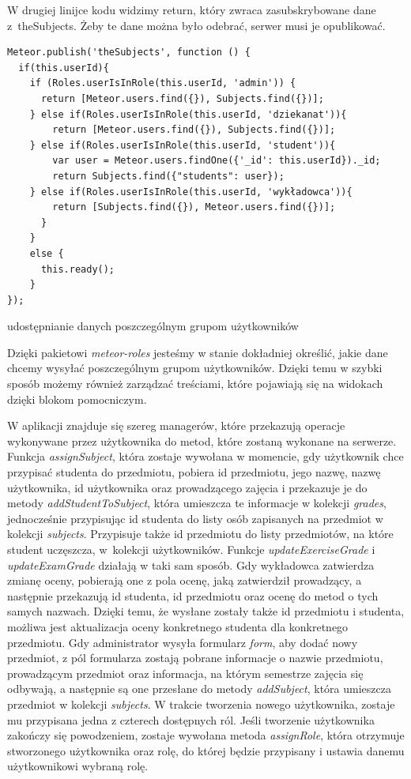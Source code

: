 \documentclass{xmgr}
\begin{document}
W drugiej linijce kodu widzimy return, który zwraca zasubskrybowane dane z~theSubjects. Żeby te dane można było odebrać, serwer musi je opublikować.

\begin{listing}[H]
\begin{verbatim}
Meteor.publish('theSubjects', function () {
  if(this.userId){
    if (Roles.userIsInRole(this.userId, 'admin')) {
      return [Meteor.users.find({}), Subjects.find({})];
    } else if(Roles.userIsInRole(this.userId, 'dziekanat')){
        return [Meteor.users.find({}), Subjects.find({})];
    } else if(Roles.userIsInRole(this.userId, 'student')){
        var user = Meteor.users.findOne({'_id': this.userId})._id;
        return Subjects.find({"students": user});
    } else if(Roles.userIsInRole(this.userId, 'wykładowca')){
        return [Subjects.find({}), Meteor.users.find({})];
      }
    }
    else {
      this.ready();
    }
});
\end{verbatim}
\caption{udostępnianie danych poszczególnym grupom użytkowników}
\end{listing}

Dzięki pakietowi \textit{meteor-roles} jesteśmy w stanie dokładniej określić, jakie dane chcemy wysyłać poszczególnym grupom użytkowników. Dzięki temu w szybki sposób możemy również zarządzać treściami, które pojawiają się na widokach dzięki blokom pomocniczym.

W aplikacji znajduje się szereg managerów, które przekazują operacje wykonywane przez użytkownika do metod, które zostaną wykonane na serwerze. Funkcja \textit{assignSubject}, która zostaje wywołana w momencie, gdy użytkownik chce przypisać studenta do przedmiotu, pobiera id przedmiotu, jego nazwę, nazwę użytkownika, id użytkownika oraz prowadzącego zajęcia i przekazuje je do metody \textit{addStudentToSubject}, która umieszcza te informacje w kolekcji \textit{grades}, jednocześnie przypisując id studenta do listy osób zapisanych na przedmiot w kolekcji \textit{subjects}. Przypisuje także id przedmiotu do listy przedmiotów, na które student uczęszcza, w~kolekcji użytkowników. Funkcje \textit{updateExerciseGrade} i \textit{updateExamGrade} działają w taki sam sposób. Gdy wykładowca zatwierdza zmianę oceny, pobierają one z pola ocenę, jaką zatwierdził prowadzący, a następnie przekazują id studenta, id przedmiotu oraz ocenę do metod o tych samych nazwach. Dzięki temu, że wysłane zostały także id przedmiotu i studenta, możliwa jest aktualizacja oceny konkretnego studenta dla konkretnego przedmiotu. Gdy administrator wysyła formularz \textit{form}, aby dodać nowy przedmiot, z pól formularza zostają pobrane informacje o nazwie przedmiotu, prowadzącym przedmiot oraz informacja, na którym semestrze zajęcia się odbywają, a następnie są one przesłane do metody \textit{addSubject}, która umieszcza przedmiot w kolekcji \textit{subjects}. W trakcie tworzenia nowego użytkownika, zostaje mu przypisana jedna z czterech dostępnych ról. Jeśli tworzenie użytkownika zakończy się powodzeniem, zostaje wywołana metoda \textit{assignRole}, która otrzymuje stworzonego użytkownika oraz rolę, do której będzie przypisany i ustawia danemu użytkownikowi wybraną rolę.
\end{document}

